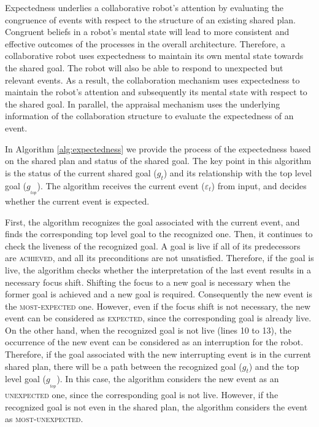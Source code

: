 \documentclass{aamas2016}
\begin{document}
Expectedness underlies a collaborative robot's attention by evaluating the
congruence of events with respect to the structure of an existing shared plan.
Congruent beliefs in a robot's mental state will lead to more consistent and
effective outcomes of the processes in the overall architecture. Therefore,
a collaborative robot uses expectedness to maintain its own mental state towards
the shared goal. The robot will also be able to respond to unexpected but
relevant events. As a result, the collaboration mechanism uses expectedness to
maintain the robot's attention and subsequently its mental state with respect to
the shared goal. In parallel, the appraisal mechanism uses the underlying
information of the collaboration structure to evaluate the expectedness of an
event.

In Algorithm \ref{alg:expectedness} we provide the process of the expectedness
based on the shared plan and status of the shared goal. The key point in this
algorithm is the status of the current shared goal ($\mathit{g}_{t}$) and its
relationship with the top level goal ($\mathit{g}_{_{top}}$). The algorithm
receives the current event ($\varepsilon_t$) from input, and decides whether the
current event is expected.

First, the algorithm recognizes the goal associated with the current event, and
finds the corresponding top level goal to the recognized one. Then, it continues
to check the liveness of the recognized goal. A goal is live if all of its
predecessors are \textsc{achieved}, and all its preconditions are not
{unsatisfied}. Therefore, if the goal is live, the algorithm checks whether the
interpretation of the last event results in a necessary focus shift. Shifting
the focus to a new goal is necessary when the former goal is achieved and a new
goal is required. Consequently the new event is the \textsc{most-expected} one.
However, even if the focus shift is not necessary, the new event can be
considered as \textsc{expected}, since the corresponding goal is already live.
On the other hand, when the recognized goal is not live (lines 10 to 13), the
occurrence of the new event can be considered as an interruption for the robot.
Therefore, if the goal associated with the new interrupting event is in the
current shared plan, there will be a path between the recognized goal
($\mathit{g}_{t}$) and the top level goal ($\mathit{g}_{_{top}}$). In this case,
the algorithm considers the new event as an \textsc{unexpected} one, since the
corresponding goal is not live. However, if the recognized goal is not even in
the shared plan, the algorithm considers the event as \textsc{most-unexpected}.
\end{document}
